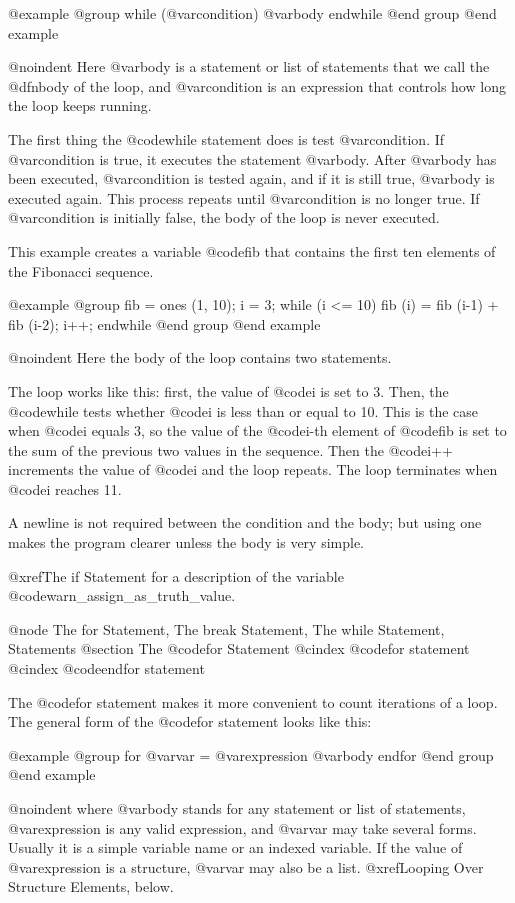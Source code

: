 @example
@group
while (@var{condition})
  @var{body}
endwhile
@end group
@end example

@noindent
Here @var{body} is a statement or list of statements that we call the
@dfn{body} of the loop, and @var{condition} is an expression that
controls how long the loop keeps running.

The first thing the @code{while} statement does is test @var{condition}.
If @var{condition} is true, it executes the statement @var{body}.  After
@var{body} has been executed, @var{condition} is tested again, and if it
is still true, @var{body} is executed again.  This process repeats until
@var{condition} is no longer true.  If @var{condition} is initially
false, the body of the loop is never executed.

This example creates a variable @code{fib} that contains the first ten
elements of the Fibonacci sequence.

@example
@group
fib = ones (1, 10);
i = 3;
while (i <= 10)
  fib (i) = fib (i-1) + fib (i-2);
  i++;
endwhile
@end group
@end example

@noindent
Here the body of the loop contains two statements.

The loop works like this: first, the value of @code{i} is set to 3.
Then, the @code{while} tests whether @code{i} is less than or equal to
10.  This is the case when @code{i} equals 3, so the value of the
@code{i}-th element of @code{fib} is set to the sum of the previous two
values in the sequence.  Then the @code{i++} increments the value of
@code{i} and the loop repeats.  The loop terminates when @code{i}
reaches 11.

A newline is not required between the condition and the
body; but using one makes the program clearer unless the body is very
simple.

@xref{The if Statement} for a description of the variable
@code{warn_assign_as_truth_value}.

@node The for Statement, The break Statement, The while Statement, Statements
@section The @code{for} Statement
@cindex @code{for} statement
@cindex @code{endfor} statement

The @code{for} statement makes it more convenient to count iterations of a
loop.  The general form of the @code{for} statement looks like this:

@example
@group
for @var{var} = @var{expression}
  @var{body}
endfor
@end group
@end example

@noindent
where @var{body} stands for any statement or list of statements,
@var{expression} is any valid expression, and @var{var} may take several
forms.  Usually it is a simple variable name or an indexed variable.  If
the value of @var{expression} is a structure, @var{var} may also be a
list.  @xref{Looping Over Structure Elements}, below.

